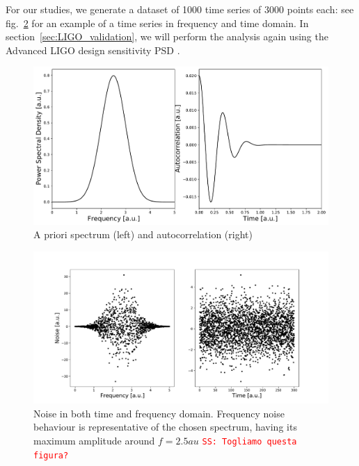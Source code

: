 \documentclass[twocolumn,showpacs,preprintnumbers,nofootinbib,prd,
superscriptaddress,10pt]{revtex4-1}
\newcommand{\sschmidt}[1]{{\textcolor{red}{\texttt{SS: #1}} }}
\begin{document}
For our studies, we generate a dataset of 1000 time series of 3000 points each: see fig.~\ref{fig:noise} for an example of a time series in frequency and time domain.
In section~\ref{sec:LIGO_validation}, we will perform the analysis again using the Advanced LIGO design sensitivity PSD \cite{Ligo}.

\begin{figure}
	\centering
	\includegraphics[width = \linewidth]{Images/Noise and PSD/NormalPSDautocorr.pdf}
	\caption{A priori spectrum (left) and autocorrelation (right)}
	\label{fig:autocorr}
\end{figure}

\begin{figure}
    \centering
        \includegraphics[width = \linewidth]{Images/NormalPSD/NormalNoise.pdf}
    \caption{Noise in both time and frequency domain. Frequency noise behaviour is representative of the chosen spectrum, having its maximum amplitude around $f = 2.5 au$ \sschmidt{Togliamo questa figura?}}
    \label{fig:noise}
\end{figure}
\end{document}

